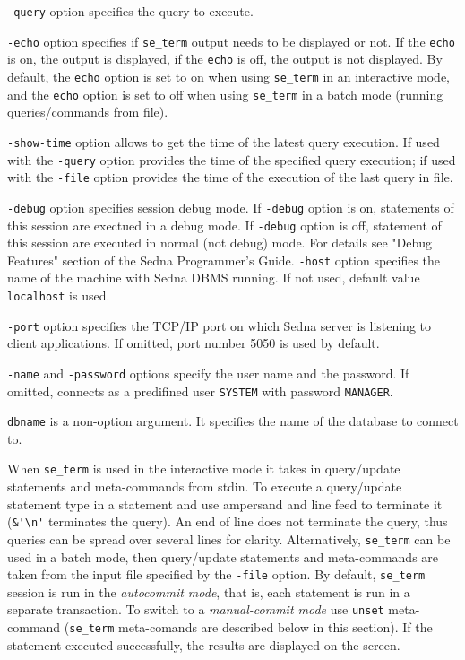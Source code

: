 \documentclass[a4paper,12pt]{article}
\begin{document}
\verb!-query! option specifies the query to execute.

\verb!-echo! option specifies if \verb!se_term! output needs to be displayed or not. If the \verb!echo! is on, the output is displayed, if the \verb!echo! is off, the output is not displayed. By default, the \verb!echo! option is set to on when using \verb!se_term! in an interactive mode, and the \verb!echo! option is set to off when using \verb!se_term! in a batch mode (running queries/commands from file).

\verb!-show-time! option allows to get the time of the latest query execution. If used with the \verb!-query! option provides the time of the specified query execution; if used with the \verb!-file! option provides the time of the execution of the last query in file.

\verb!-debug! option specifies session debug mode. If \verb!-debug! option is on, statements of this session are exectued in a debug mode. If \verb!-debug! option is off, statement of this session are executed in normal (not debug) mode. For details see "Debug Features" section of the Sedna Programmer's Guide.
\verb!-host! option specifies the name of the machine with Sedna DBMS running. If not used, default value \verb!localhost! is used.

\verb!-port! option specifies the TCP/IP port on which Sedna server is listening to client applications. If omitted, port number 5050 is used by default.

\verb!-name! and \verb!-password! options specify the user name and the password. If omitted, connects as a predifined user \verb!SYSTEM! with password \verb!MANAGER!.

\verb!dbname! is a non-option argument. It specifies the name of the database to connect to.

When \verb!se_term! is used in the interactive mode it takes in query/update statements and meta-commands from stdin. To execute a query/update statement type in a statement and use ampersand and line feed to terminate it (\verb!&'\n'! terminates the query). An end of line does not terminate the query, thus queries can be spread over several lines for clarity. Alternatively, \verb!se_term! can be used in a batch mode, then query/update statements and meta-commands are taken from the input file specified by the \verb!-file! option. By default, \verb!se_term! session is run in the \emph{autocommit mode}, that is, each statement is run in a separate transaction. To switch to a \emph{manual-commit mode} use \verb!unset! meta-command (\verb!se_term! meta-comands are described below in this section). If the statement executed successfully, the results are displayed on the screen.
\end{document}
